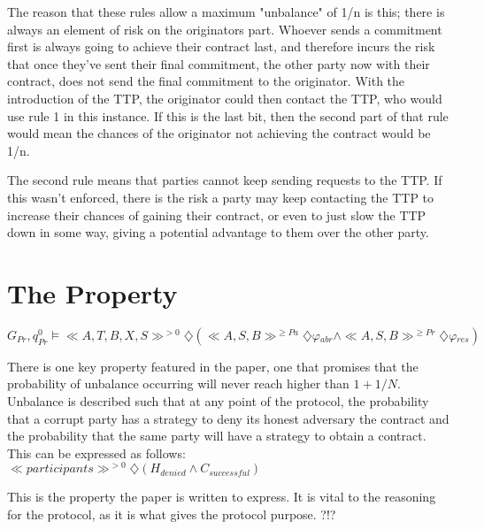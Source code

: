 \documentclass{l4proj}
\begin{document}
The reason that these rules allow a maximum "unbalance" of 1/n is this; there is always an element of risk on the originators part. Whoever sends a commitment first is always going to achieve their contract last, and therefore incurs the risk that once they've sent their final commitment, the other party now with their contract, does not send the final commitment to the originator. With the introduction of the TTP, the originator could then contact the TTP, who would use rule 1 in this instance. If this is the last bit, then the second part of that rule would mean the chances of the originator not achieving the contract would be 1/n.

The second rule means that parties cannot keep sending requests to the TTP. If this wasn't enforced, there is the risk a party may keep contacting the TTP  to increase their chances of gaining their contract, or even to just slow the TTP down in some way, giving a potential advantage to them over the other party.

\section{The Property}

$ G{_{Pr}},q_{Pr}^{0}\models  \ll A, T, B, X, S \gg ^{>0} \diamondsuit (\ll A, S, B \gg^{\ge Pa} \diamondsuit \varphi{_{abr}}  \wedge \ll A, S, B \gg^{\ge Pr} \diamondsuit \varphi{_{res}}) $



There is one key property featured in the paper, one that promises that the probability of unbalance occurring will never reach higher than $1+1/N$. Unbalance is described such that at any point of the protocol, the probability that a corrupt party has a strategy to deny its honest adversary the contract and the probability that the same party will have a strategy to obtain a contract. This can be expressed as follows:\\
$\ll participants \gg ^{>0} \diamondsuit (H_{denied}  \wedge C_{successful}) $

This is the property the paper is written to express. It is vital to the reasoning for the protocol, as it is what gives the protocol purpose. ?!?
\end{document}
